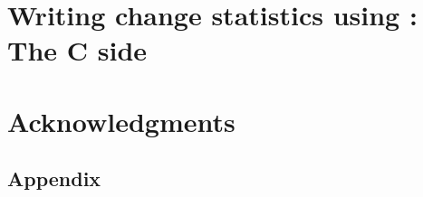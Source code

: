 \documentclass[article]{jss}
\begin{document}
\section[Writing change statistics using ergmuserterms:  The C side]%
{Writing change statistics using :  The C side}

\section*{Acknowledgments}





\newpage

\begin{appendix}


\section[appendix]{Appendix}
\label{appendix}

\end{appendix}
\end{document}
